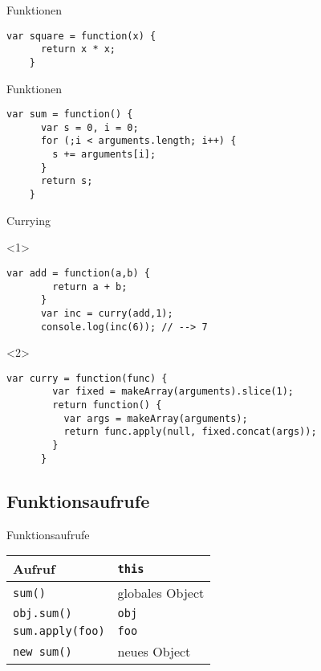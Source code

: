 \begin{frame}[fragile]{Funktionen}
  \begin{lstlisting}[gobble=4]
    var square = function(x) {
      return x * x;
    }
  \end{lstlisting}
\end{frame}

\begin{frame}[fragile]{Funktionen}
  \begin{lstlisting}[gobble=4]
    var sum = function() {
      var s = 0, i = 0;
      for (;i < arguments.length; i++) {
        s += arguments[i];
      }
      return s;
    }
  \end{lstlisting}
\end{frame}

\begin{frame}[fragile]{Currying}
  \begin{onlyenv}<1>
    \begin{lstlisting}[gobble=6]
      var add = function(a,b) {
        return a + b;
      }
      var inc = curry(add,1);
      console.log(inc(6)); // --> 7
    \end{lstlisting}
  \end{onlyenv}
  
  \begin{onlyenv}<2>
    \begin{lstlisting}[gobble=6]
      var curry = function(func) {
        var fixed = makeArray(arguments).slice(1);
        return function() {
          var args = makeArray(arguments);
          return func.apply(null, fixed.concat(args));
        }
      }
    \end{lstlisting}
  \end{onlyenv}
\end{frame}

\subsection{Funktionsaufrufe}

\begin{frame}{Funktionsaufrufe}
  \begin{tabular}{ll}
    Aufruf & \lstinline-this- \\ \hline
    \lstinline-sum()- & globales Object \\
    \lstinline-obj.sum()- & \lstinline-obj- \\
    \lstinline-sum.apply(foo)- & \lstinline-foo- \\
    \lstinline-new sum()- & neues Object
  \end{tabular}
\end{frame}

